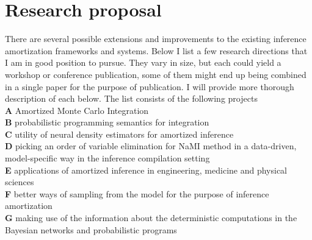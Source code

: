 \documentclass[12pt]{article}
\begin{document}


% 
% 


\section{Research proposal}
There are several possible extensions and improvements to the existing inference amortization frameworks and systems. 
Below I list a few research directions that I am in good position to pursue.
They vary in size, but each could yield a workshop or conference publication, some of them might end up being combined in a single paper for the purpose of publication.
I will provide more thorough description of each below.
The list consists of the following projects\\
\textbf{A} \quad Amortized Monte Carlo Integration\\
\textbf{B} \quad probabilistic programming semantics for integration\\
\textbf{C} \quad utility of neural density estimators for amortized inference\\
\textbf{D} \quad picking an order of variable elimination for NaMI method in a data-driven, model-specific way in the inference compilation setting\\
\textbf{E} \quad applications of amortized inference in engineering, medicine and physical sciences\\
\textbf{F} \quad better ways of sampling from the model for the purpose of inference amortization\\
\textbf{G} \quad making use of the information about the deterministic computations in the Bayesian networks and probabilistic programs\\
\end{document}
